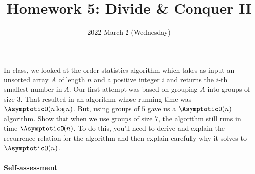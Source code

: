 \documentclass{ks-pset}
\title{Homework 5: Divide \& Conquer II}
\date{2022 March 2 (Wednesday)}
\author{}
\begin{document}
\begin{problem}

  In class, we looked at the order statistics algorithm  which
  takes as input an unsorted array \(A\) of length \(n\) and a positive integer
  \(i\) and returns the \(i\)-th smallest number in \(A\). Our first attempt
  was based on grouping \(A\) into groups of size 3.  That resulted in an
  algorithm whose running time was \(\AsymptoticO(n \log n)\).  But, using
  groups of \(5\) gave us a \(\AsymptoticO(n)\) algorithm.  Show that when we
  use groups of size \(7\), the algorithm still runs in time
  \(\AsymptoticO(n)\).  To do this, you'll need to derive and explain the
  recurrence relation for the algorithm and then explain carefully why it
  solves to \(\AsymptoticO(n)\).

\end{problem}

\begin{solution}

  \paragraph{Self-assessment}
\end{solution}
\end{document}
